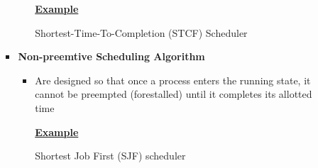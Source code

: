 \documentclass[12pt]{article}
\begin{document}
\begin{enumerate}[1.]
\begin{enumerate}[a)]
\begin{itemize}
\begin{itemize}
                \bigskip

                \underline{\textbf{Example}}

                \bigskip

                Shortest-Time-To-Completion (STCF) Scheduler

                \bigskip
            \end{itemize}
            \item \textbf{Non-preemtive Scheduling Algorithm}

            \begin{itemize}
                \item Are designed so that once a process enters the running state,
                it cannot be preempted (forestalled) until it completes its allotted time

                \bigskip

                \underline{\textbf{Example}}

                \bigskip

                Shortest Job First (SJF) scheduler
            \end{itemize}
        \end{itemize}

    \end{enumerate}





\end{enumerate}
\end{document}
